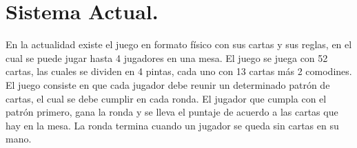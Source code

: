 \section{Sistema Actual.}\label{cap:sistemaActual}
En la actualidad existe el juego en formato físico con sus cartas y sus reglas, en el cual se puede jugar hasta 4 jugadores
en una mesa. El juego se juega con 52 cartas, las cuales se dividen en 4 pintas, cada uno con 13 cartas más 2 comodines.
El juego consiste en que cada jugador debe reunir un determinado patrón de cartas, el cual se debe cumplir en cada ronda.
El jugador que cumpla con el patrón primero, gana la ronda y se lleva el puntaje de acuerdo a las cartas que hay en la mesa. 
La ronda termina cuando un jugador se queda sin cartas en su mano. 

